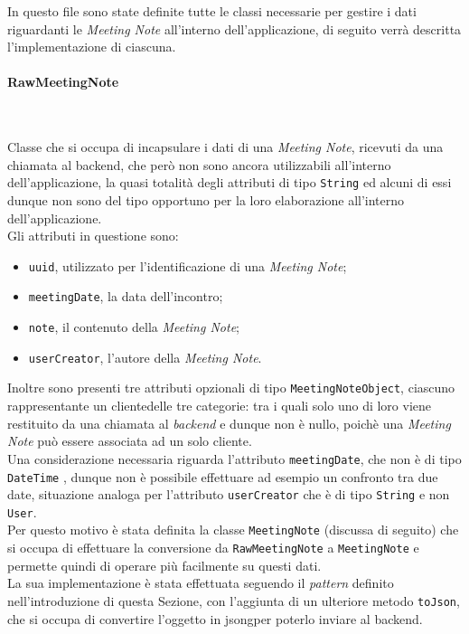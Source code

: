 In questo file sono state definite tutte le classi necessarie per gestire i dati riguardanti le \emph{Meeting Note} all'interno dell'applicazione, di seguito verrà descritta l'implementazione di ciascuna.

\paragraph*{RawMeetingNote} ~ \\
\label{par:raw-meeting-note}

\noindent Classe che si occupa di incapsulare i dati di una \emph{Meeting Note}, ricevuti da una chiamata al \gls{backend}\glsoccur, che però non sono ancora utilizzabili all'interno dell'applicazione, la quasi totalità degli attributi di tipo \lstinline{String} ed alcuni di essi dunque non sono del tipo opportuno per la loro elaborazione all'interno dell'applicazione.\\
Gli attributi in questione sono:
\begin{itemize}
    \item \lstinline{uuid}, utilizzato per l'identificazione di una \emph{Meeting Note};
    \item \lstinline{meetingDate}, la data dell'incontro;
    \item \lstinline{note}, il contenuto della \emph{Meeting Note};
    \item \lstinline{userCreator}, l'autore della \emph{Meeting Note}.
\end{itemize}
Inoltre sono presenti tre attributi opzionali di tipo \lstinline{MeetingNoteObject}, ciascuno rappresentante un \gls{cliente}\glsoccur delle tre categorie: tra i quali solo uno di loro viene restituito da una chiamata al \emph{backend} e dunque non è nullo, poichè una \emph{Meeting Note} può essere associata ad un solo \gls{cliente}\glsoccur.\\
Una considerazione necessaria riguarda l'attributo \lstinline{meetingDate}, che non è di tipo \lstinline{DateTime} \cite{site:date-time}, dunque non è possibile effettuare ad esempio un confronto tra due date, situazione analoga per l'attributo \lstinline{userCreator} che è di tipo \lstinline{String} e non \lstinline{User}.\\
Per questo motivo è stata definita la classe \lstinline{MeetingNote} (discussa di seguito) che si occupa di effettuare la conversione da \lstinline{RawMeetingNote} a \lstinline{MeetingNote} e permette quindi di operare più facilmente su questi dati. \\
La sua implementazione è stata effettuata seguendo il \emph{pattern} definito nell'introduzione di questa Sezione, con l'aggiunta di un ulteriore metodo \lstinline{toJson}, che si occupa di convertire l'oggetto in \gls{jsong}\glsoccur per poterlo inviare al \gls{backend}\glsoccur.

